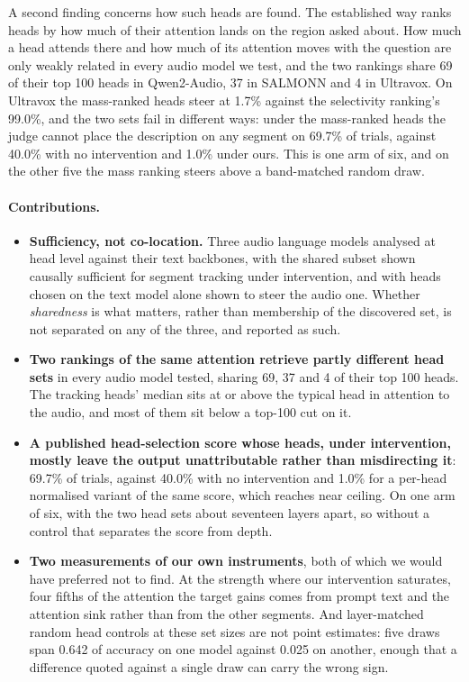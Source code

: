\documentclass[11pt]{article}
\begin{document}
A second finding concerns how such heads are found. The established way ranks
heads by how much of their attention lands on the region asked about. How much a
head attends there and how much of its attention moves with the question are only
weakly related in every audio model we test, and the two rankings share 69 of their top
100 heads in Qwen2-Audio, 37 in SALMONN and 4 in Ultravox. On Ultravox the
mass-ranked heads steer at 1.7\% against the selectivity ranking's 99.0\%, and the
two sets fail in different ways: under the mass-ranked heads the judge cannot
place the description on any segment on 69.7\% of trials, against 40.0\% with no
intervention and 1.0\% under ours. This is one arm of six, and on the other five
the mass ranking steers above a band-matched random draw.

\paragraph{Contributions.}
\begin{itemize}\itemsep2pt \parskip0pt
\item \textbf{Sufficiency, not co-location.} Three audio language models analysed
at head level against their text backbones, with the shared subset shown
causally sufficient for segment tracking under intervention, and with heads
chosen on the text model alone shown to steer the audio one. Whether
\emph{sharedness} is what matters, rather than membership of the discovered set,
is not separated on any of the three, and reported as such.
\item \textbf{Two rankings of the same attention retrieve partly different head
sets} in every audio model tested, sharing 69, 37 and 4 of their top 100 heads.
The tracking heads' median sits at or above the typical head in attention to the
audio, and most of them sit below a top-100 cut on it.
\item \textbf{A published head-selection score whose heads, under intervention,
mostly leave the output unattributable rather than misdirecting it}: 69.7\% of
trials, against 40.0\% with no intervention and 1.0\% for a per-head normalised
variant of the same score, which reaches near ceiling. On one arm of six, with
the two head sets about seventeen layers apart, so without a control that separates
the score from depth.
\item \textbf{Two measurements of our own instruments}, both of which we would
have preferred not to find. At the strength where our intervention saturates,
four fifths of the attention the target gains comes from prompt text and the
attention sink rather than from the other segments. And layer-matched random head
controls at these set sizes are not point estimates: five draws span 0.642 of
accuracy on one model against 0.025 on another, enough that a difference quoted
against a single draw can carry the wrong sign.
\end{itemize}
\end{document}

